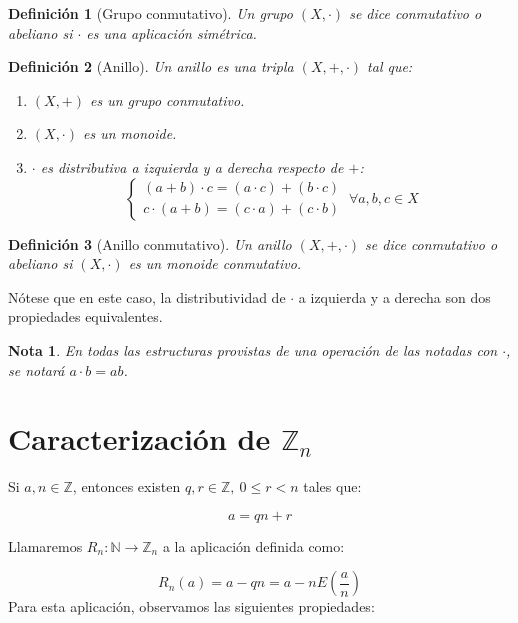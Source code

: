 \documentclass[11pt, a4paper, titlepage]{article}
\theoremstyle{theorem-style}
\theoremstyle{definition-style}
\newtheorem*{ndef}{Definición}
\theoremstyle{remark-style}
\newtheorem*{nota}{Nota}
\theoremstyle{example-style}
\newenvironment{nlist}
{\begin{enumerate}
\renewcommand\labelenumi{(\emph{\roman{enumi})}}}
{\end{enumerate}}
\begin{document}
\begin{ndef}[Grupo conmutativo]
  Un grupo $(X, \cdot)$ se dice \emph{conmutativo} o \emph{abeliano} si $\cdot$ es una aplicación simétrica.
\end{ndef}


\begin{ndef}[Anillo]

  Un anillo es una tripla $(X, +, \cdot)$ tal que:

  \begin{nlist}
  \item $(X, +)$ es un grupo conmutativo.
  \item $(X, \cdot)$ es un monoide.
  \item $\cdot$ es distributiva a izquierda y a derecha respecto de $+$:
    \[
    \begin{cases}
      (a + b) \cdot c = (a \cdot c) + (b \cdot c)\\
      c \cdot (a + b) = (c \cdot a) + (c \cdot b)
    \end{cases} \ \forall a,b,c \in X
    \]

  \end{nlist}

\end{ndef}

\begin{ndef}[Anillo conmutativo]
  Un anillo $(X, +, \cdot)$ se dice \emph{conmutativo} o \emph{abeliano} si $(X, \cdot)$ es un monoide conmutativo.
\end{ndef}

Nótese que en este caso, la distributividad de $\cdot$ a izquierda y a derecha son dos propiedades equivalentes.

\begin{nota}
  En todas las estructuras provistas de una operación de las notadas con $\cdot$, se notará $a \cdot b = ab$.
\end{nota}


\section*{Caracterización de $\mathbb{Z}_{n}$}

Si $a,n\in \mathbb{Z}$, entonces existen $q,r \in \mathbb{Z},\ 0 \le r < n$ tales que:

\[
    a = qn + r
\]

Llamaremos $R_n:\mathbb{N} \rightarrow \mathbb{Z}_n$ a la aplicación definida como:

\[
R_n(a) = a - qn = a- nE\left(\frac{a}{n}\right)
\] 
Para esta aplicación, observamos las siguientes propiedades:
\end{document}
